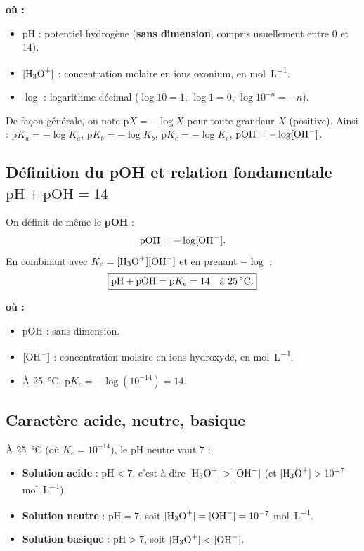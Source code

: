 \documentclass[11pt,a4paper]{article}
\newenvironment{ou}{%
  \par\smallskip\noindent\textbf{où :}\nopagebreak
  \begin{itemize}[leftmargin=1.8em,topsep=2pt,itemsep=1.5pt,parsep=0pt]}%
  {\end{itemize}}
\begin{document}
\begin{ou}
\item $\mathrm{pH}$ : potentiel hydrogène (\textbf{sans dimension}, compris usuellement entre 0 et 14).
\item $[\ce{H3O+}]$ : concentration molaire en ions oxonium, en \si{mol.L^{-1}}.
\item $\log$ : logarithme décimal ($\log 10 = 1$, $\log 1 = 0$, $\log 10^{-n} = -n$).
\end{ou}

\begin{regle}[pK]
De façon générale, on note $\mathrm{p}X = -\log X$ pour toute grandeur $X$ (positive). Ainsi :
$\mathrm{p}K_a = -\log K_a$, $\mathrm{p}K_b = -\log K_b$, $\mathrm{p}K_e = -\log K_e$, $\mathrm{pOH} = -\log[\ce{OH-}]$.
\end{regle}

\subsection{Définition du pOH et relation fondamentale $\mathrm{pH}+\mathrm{pOH}=14$}

\begin{formule}
On définit de même le \textbf{pOH} :
\[ \mathrm{pOH} = -\log[\ce{OH-}]. \]
En combinant avec $K_e = [\ce{H3O+}][\ce{OH-}]$ et en prenant $-\log$ :
\[ \boxed{\mathrm{pH} + \mathrm{pOH} = \mathrm{p}K_e = 14 \quad \text{à \SI{25}{\celsius}}.} \]
\end{formule}

\begin{ou}
\item $\mathrm{pOH}$ : sans dimension.
\item $[\ce{OH-}]$ : concentration molaire en ions hydroxyde, en \si{mol.L^{-1}}.
\item À \SI{25}{\celsius}, $\mathrm{p}K_e = -\log(10^{-14}) = 14$.
\end{ou}

\subsection{Caractère acide, neutre, basique}

\begin{regle}
À \SI{25}{\celsius} (où $K_e = 10^{-14}$), le pH neutre vaut $7$ :
\begin{itemize}[leftmargin=1.6em,topsep=2pt,itemsep=2pt]
  \item \textbf{Solution acide} : $\mathrm{pH} < 7$, c'est-à-dire $[\ce{H3O+}] > [\ce{OH-}]$ (et
        $[\ce{H3O+}] > 10^{-7}$ \si{mol.L^{-1}}).
  \item \textbf{Solution neutre} : $\mathrm{pH} = 7$, soit $[\ce{H3O+}] = [\ce{OH-}] = 10^{-7}$ \si{mol.L^{-1}}.
  \item \textbf{Solution basique} : $\mathrm{pH} > 7$, soit $[\ce{H3O+}] < [\ce{OH-}]$.
\end{itemize}
\end{regle}
\end{document}
